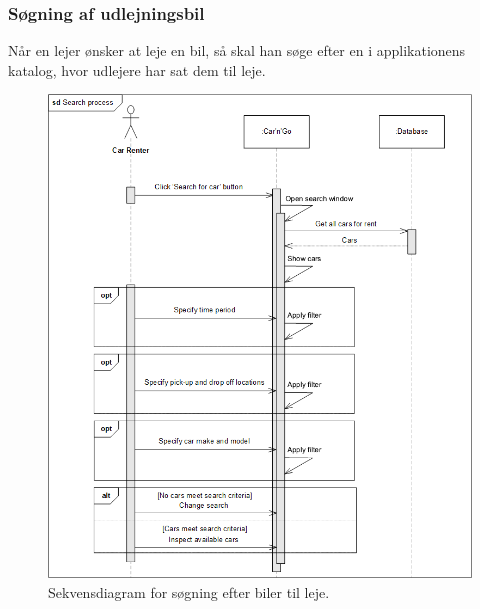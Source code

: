\documentclass[Arkitektur/System_main.tex]{subfiles}
\begin{document}
\subsubsection{Søgning af udlejningsbil}
Når en lejer ønsker at leje en bil, så skal han søge efter en i applikationens katalog, hvor udlejere har sat dem til leje. 
\begin{figure}[H]
    \centering
    \includegraphics[width=1\textwidth]{Arkitektur/Softwarearkitektur/Searching/graphics/Search_Process_SD.png}
    \caption{Sekvensdiagram for søgning efter biler til leje. }
    \label{fig:SearchProcessSD}
\end{figure}
\end{document}
